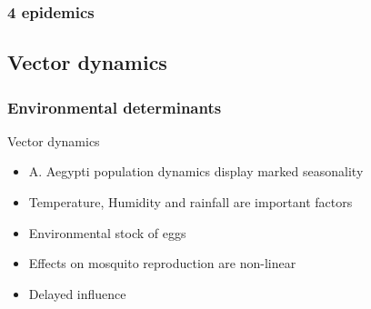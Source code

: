 \documentclass[10pt,compress,notheorems]{beamer}
\begin{document}
\begin{frame}[fragile]
\frametitle{4 epidemics}
\begin{flushleft}
 \begin{figure}
  \end{figure}
\end{flushleft}

\end{frame}

\subsection{Vector dynamics}

\begin{frame}
\frametitle{Environmental determinants}
\begin{block}{Vector dynamics}
\begin{itemize}[<+->]
 \item A. Aegypti population dynamics display marked seasonality
 \item Temperature, Humidity and rainfall are important factors
 \item Environmental stock of eggs
 \item Effects on mosquito reproduction are non-linear
 \item Delayed influence
\end{itemize}
\end{block}

\end{frame}
\end{document}

